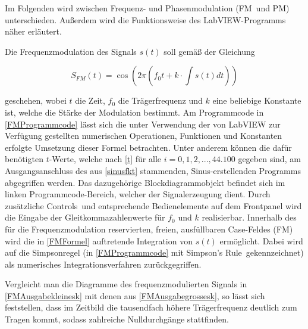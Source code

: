 \documentclass[
a4paper,
12pt,
pagesize,
ngerman
]{scrartcl}
\begin{document}
	Im Folgenden wird zwischen Frequenz- und Phasenmodulation (\glqq FM\grqq\ und \glqq PM\grqq ) unterschieden.
	Außerdem wird die Funktionsweise des LabVIEW-Programms näher erläutert.
	
	Die Frequenzmodulation des Signals $s(t)$ soll gemäß der Gleichung
	
	\begin{equation} \label{FMFormel}
	S_{FM}(t) = \cos (2\pi (f_0 t + k \cdot \int s(t) dt))
	\end{equation}
	
	\noindent geschehen, wobei $t$ die Zeit, $f_0$ die Trägerfrequenz und $k$ eine beliebige Konstante ist, welche die Stärke der Modulation bestimmt. 
	Am Programmcode in \cref{FMProgrammcode} lässt sich die unter Verwendung der von LabVIEW zur Verfügung gestellten numerischen Operationen, Funktionen und Konstanten erfolgte Umsetzung dieser Formel betrachten. 
	Unter anderem können die dafür benötigten $t$-Werte, welche nach \cref{t} für alle $i = 0,1,2,...,44.100$ gegeben sind, am Ausgangsanschluss des aus \cref{sinusfkt} stammenden, Sinus-erstellenden Programms abgegriffen werden. 
	Das dazugehörige Blockdiagrammobjekt befindet sich im linken Programmcode-Bereich, welcher der Signalerzeugung dient. 
	Durch zusätzliche \glqq Controls\grqq\ und entsprechende Bedienelemente auf dem Frontpanel wird die Eingabe der Gleitkommazahlenwerte für $f_0$ und $k$ realisierbar. 
	Innerhalb des für die Frequenzmodulation reservierten, freien, ausfüllbaren Case-Feldes (\glqq FM\grqq ) wird die in \cref{FMFormel} auftretende Integration von $s(t)$ ermöglicht. %
	Dabei wird auf die Simpsonregel (in \cref{FMProgrammcode} mit \glqq Simpson's Rule\grqq\ gekennzeichnet) als numerisches Integrationsverfahren zurückgegriffen.
	
	Vergleicht man die Diagramme des frequenzmodulierten Signals in \cref{FMAusgabekleinesk} mit denen aus \cref{FMAusgabegrossesk}, so lässt sich feststellen, dass im Zeitbild die tausendfach höhere Trägerfrequenz deutlich zum Tragen kommt, sodass zahlreiche Nulldurchgänge stattfinden. 
	
\end{document}
